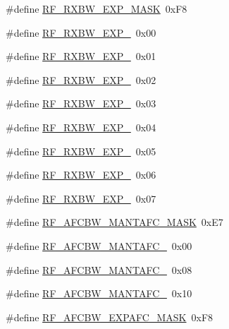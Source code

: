 \begin{DoxyCompactItemize}
\item 
\#define \mbox{\hyperlink{sx1276_regs-_fsk_8h_ab161ca7f3051baf8f6f27a4f177db024}{R\+F\+\_\+\+R\+X\+B\+W\+\_\+\+E\+X\+P\+\_\+\+M\+A\+SK}}~0x\+F8
\item 
\#define \mbox{\hyperlink{sx1276_regs-_fsk_8h_abcc6bb74aa70ef98f9ebe7a145598c69}{R\+F\+\_\+\+R\+X\+B\+W\+\_\+\+E\+X\+P\+\_}}~0x00
\item 
\#define \mbox{\hyperlink{sx1276_regs-_fsk_8h_a96e6aefdfd02d7b9c56bd3cc2ccee993}{R\+F\+\_\+\+R\+X\+B\+W\+\_\+\+E\+X\+P\+\_}}~0x01
\item 
\#define \mbox{\hyperlink{sx1276_regs-_fsk_8h_ac6ae039c9acf780cf56782004f273e1e}{R\+F\+\_\+\+R\+X\+B\+W\+\_\+\+E\+X\+P\+\_}}~0x02
\item 
\#define \mbox{\hyperlink{sx1276_regs-_fsk_8h_a9c4a24cd2f131d5b4222ae0081f90add}{R\+F\+\_\+\+R\+X\+B\+W\+\_\+\+E\+X\+P\+\_}}~0x03
\item 
\#define \mbox{\hyperlink{sx1276_regs-_fsk_8h_a1df24f4f0853faae82bab62e77a81478}{R\+F\+\_\+\+R\+X\+B\+W\+\_\+\+E\+X\+P\+\_}}~0x04
\item 
\#define \mbox{\hyperlink{sx1276_regs-_fsk_8h_a6b7bec394371c0536f76fc58836b2b99}{R\+F\+\_\+\+R\+X\+B\+W\+\_\+\+E\+X\+P\+\_}}~0x05
\item 
\#define \mbox{\hyperlink{sx1276_regs-_fsk_8h_a720c06b4d807792b0a75073b3f826c9f}{R\+F\+\_\+\+R\+X\+B\+W\+\_\+\+E\+X\+P\+\_}}~0x06
\item 
\#define \mbox{\hyperlink{sx1276_regs-_fsk_8h_a600d1cc75c5d6b87ea49e5fdf8d05de2}{R\+F\+\_\+\+R\+X\+B\+W\+\_\+\+E\+X\+P\+\_}}~0x07
\item 
\#define \mbox{\hyperlink{sx1276_regs-_fsk_8h_a7d35ac3bf14ffc3be17ac5450bc781a7}{R\+F\+\_\+\+A\+F\+C\+B\+W\+\_\+\+M\+A\+N\+T\+A\+F\+C\+\_\+\+M\+A\+SK}}~0x\+E7
\item 
\#define \mbox{\hyperlink{sx1276_regs-_fsk_8h_abf43472df1a0e71a5381ab56f212366b}{R\+F\+\_\+\+A\+F\+C\+B\+W\+\_\+\+M\+A\+N\+T\+A\+F\+C\+\_}}~0x00
\item 
\#define \mbox{\hyperlink{sx1276_regs-_fsk_8h_aac631ae8fd6d24284d6624ef2c32f0ec}{R\+F\+\_\+\+A\+F\+C\+B\+W\+\_\+\+M\+A\+N\+T\+A\+F\+C\+\_}}~0x08
\item 
\#define \mbox{\hyperlink{sx1276_regs-_fsk_8h_a0fa0fc9612a4b48114ed43fb4e2e95b4}{R\+F\+\_\+\+A\+F\+C\+B\+W\+\_\+\+M\+A\+N\+T\+A\+F\+C\+\_}}~0x10
\item 
\#define \mbox{\hyperlink{sx1276_regs-_fsk_8h_a73aab542bba68b65d6e6e529a6e502c1}{R\+F\+\_\+\+A\+F\+C\+B\+W\+\_\+\+E\+X\+P\+A\+F\+C\+\_\+\+M\+A\+SK}}~0x\+F8

\end{DoxyCompactItemize}
